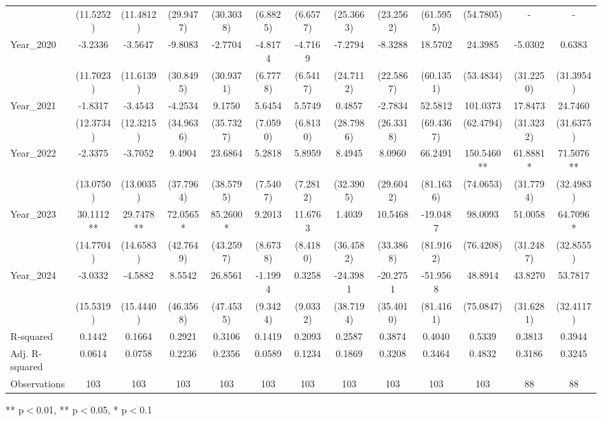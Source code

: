 \begin{table}[htbp]
\begin{tabular}{lcccccccccccc}
 & (11.5252) & (11.4812) & (29.9477) & (30.3038) & (6.8825) & (6.6577) & (25.3663) & (23.2562) & (61.5955) & (54.7805) & - & - \\
Year\_2020 & -3.2336 & -3.5647 & -9.8083 & -2.7704 & -4.8174 & -4.7169 & -7.2794 & -8.3288 & 18.5702 & 24.3985 & -5.0302 & 0.6383 \\
 & (11.7023) & (11.6139) & (30.8495) & (30.9371) & (6.7778) & (6.5417) & (24.7112) & (22.5867) & (60.1351) & (53.4834) & (31.2250) & (31.3954) \\
Year\_2021 & -1.8317 & -3.4543 & -4.2534 & 9.1750 & 5.6454 & 5.5749 & 0.4857 & -2.7834 & 52.5812 & 101.0373 & 17.8473 & 24.7460 \\
 & (12.3734) & (12.3215) & (34.9636) & (35.7327) & (7.0590) & (6.8130) & (28.7986) & (26.3318) & (69.4367) & (62.4794) & (31.3232) & (31.6375) \\
Year\_2022 & -2.3375 & -3.7052 & 9.4904 & 23.6864 & 5.2818 & 5.8959 & 8.4945 & 8.0960 & 66.2491 & 150.5460** & 61.8881* & 71.5076** \\
 & (13.0750) & (13.0035) & (37.7964) & (38.5795) & (7.5407) & (7.2812) & (32.3905) & (29.6042) & (81.1636) & (74.0653) & (31.7794) & (32.4983) \\
Year\_2023 & 30.1112** & 29.7478** & 72.0565* & 85.2600* & 9.2013 & 11.6763 & 1.4039 & 10.5468 & -19.0487 & 98.0093 & 51.0058 & 64.7096* \\
 & (14.7704) & (14.6583) & (42.7649) & (43.2597) & (8.6738) & (8.4180) & (36.4582) & (33.3868) & (81.9162) & (76.4208) & (31.2487) & (32.8555) \\
Year\_2024 & -3.0332 & -4.5882 & 8.5542 & 26.8561 & -1.1994 & 0.3258 & -24.3981 & -20.2751 & -51.9568 & 48.8914 & 43.8270 & 53.7817 \\
 & (15.5319) & (15.4440) & (46.3568) & (47.4535) & (9.3424) & (9.0332) & (38.7194) & (35.4010) & (81.4161) & (75.0847) & (31.6281) & (32.4117) \\
\hline
R-squared & 0.1442 & 0.1664 & 0.2921 & 0.3106 & 0.1419 & 0.2093 & 0.2587 & 0.3874 & 0.4040 & 0.5339 & 0.3813 & 0.3944 \\
Adj. R-squared & 0.0614 & 0.0758 & 0.2236 & 0.2356 & 0.0589 & 0.1234 & 0.1869 & 0.3208 & 0.3464 & 0.4832 & 0.3186 & 0.3245 \\
Observations & 103 & 103 & 103 & 103 & 103 & 103 & 103 & 103 & 103 & 103 & 88 & 88 \\
\hline\hline
\end{tabular}
\begin{tablenotes}[flushleft]
\footnotesize
\item *** p$<$0.01, ** p$<$0.05, * p$<$0.1
\end{tablenotes}
\end{table}
